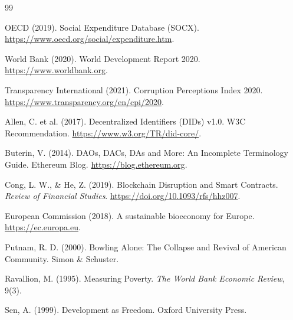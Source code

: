 \documentclass[12pt]{report}
\begin{document}
\begin{thebibliography}{99}

OECD (2019).
\newblock Social Expenditure Database (SOCX).
\newblock \href{https://www.oecd.org/social/expenditure.htm}{https://www.oecd.org/social/expenditure.htm}.

World Bank (2020).
\newblock World Development Report 2020.
\newblock \href{https://www.worldbank.org}{https://www.worldbank.org}.

Transparency International (2021).
\newblock Corruption Perceptions Index 2020.
\newblock \href{https://www.transparency.org/en/cpi/2020}{https://www.transparency.org/en/cpi/2020}.

Allen, C. et al. (2017).
\newblock Decentralized Identifiers (DIDs) v1.0.
\newblock W3C Recommendation.
\newblock \href{https://www.w3.org/TR/did-core/}{https://www.w3.org/TR/did-core/}.

Buterin, V. (2014).
\newblock DAOs, DACs, DAs and More: An Incomplete Terminology Guide.
\newblock Ethereum Blog.
\newblock \href{https://blog.ethereum.org}{https://blog.ethereum.org}.

Cong, L. W., \& He, Z. (2019).
\newblock Blockchain Disruption and Smart Contracts.
\newblock \textit{Review of Financial Studies}.
\newblock \href{https://doi.org/10.1093/rfs/hhz007}{https://doi.org/10.1093/rfs/hhz007}.

European Commission (2018).
\newblock A sustainable bioeconomy for Europe.
\newblock \href{https://ec.europa.eu}{https://ec.europa.eu}.

Putnam, R. D. (2000).
\newblock Bowling Alone: The Collapse and Revival of American Community.
\newblock Simon \& Schuster.

Ravallion, M. (1995).
\newblock Measuring Poverty.
\newblock \textit{The World Bank Economic Review}, 9(3).

Sen, A. (1999).
\newblock Development as Freedom.
\newblock Oxford University Press.

\end{thebibliography}
\end{document}

